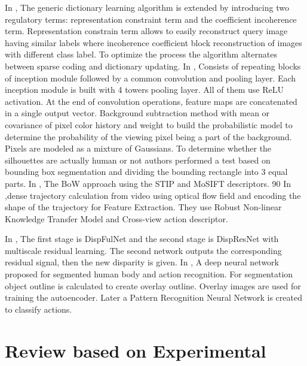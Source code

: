 \documentclass[11pt,english]{article}
\begin{document}
In \citep{zhang2018semi}, The generic dictionary learning algorithm is extended by introducing two regulatory terms: representation constraint term and the coefficient incoherence term. Representation constrain term allows to easily reconstruct query image having similar labels where incoherence coefficient block reconstruction of images with different class label. To optimize the process the algorithm alternates between sparse coding and dictionary updating.
In \citep{szegedy2015going}, Consists of repeating blocks of inception module followed by a common convolution and pooling layer. Each inception module is built with 4 towers pooling layer. All of them use ReLU activation. At the end of convolution operations, feature maps are concatenated in a single output vector.
\citep{datta2002person} Background subtraction method with mean or covariance of pixel color history and weight to build the probabilistic model to determine the probability of the viewing pixel being a part of the background. Pixels are modeled as a mixture of Gaussians. To determine whether the silhouettes are actually human or not authors performed a test based on bounding box segmentation and dividing the bounding rectangle into 3 equal parts. 
In \citep{nievas2011violence}, The BoW approach using the STIP and MoSIFT descriptors. 90%
In \citep{rahmani2018learning},dense trajectory calculation from video using optical flow field and encoding the shape of the trajectory for Feature Extraction. They use Robust Non-linear Knowledge Transfer Model and Cross-view action descriptor.

In \citep{weinzaepfel2013deepflow}, The first stage is DispFulNet and the second stage is DispResNet with multiscale residual learning. The second network outputs the corresponding residual signal, then the new disparity is given.
In \citep{xiao2017human}, A deep neural network proposed for segmented human body and action recognition. For segmentation object outline is calculated to create overlay outline. Overlay images are used for training the autoencoder. Later a Pattern Recognition Neural Network is created to classify actions.


\section{Review based on Experimental}
\end{document}
